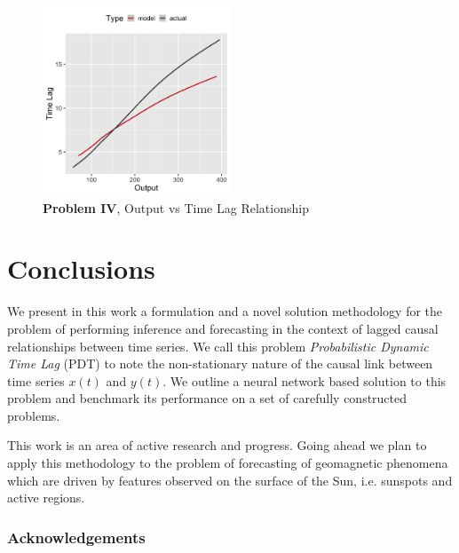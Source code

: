\documentclass[envcountsect,runningheads]{llncs}
\theoremstyle{etoile}
\begin{document}
\begin{figure}[h]
\vspace{.3in}
\centerline{\includegraphics[width=0.5\textwidth]{figures/exp4_predictive_curves.png}}
\vspace{.3in}
\caption{\textbf{Problem IV}, Output vs Time Lag Relationship}
\label{fig:problem4_curves}
\end{figure}

\section{Conclusions}

We present in this work a formulation and a novel solution methodology for the problem of performing 
inference and forecasting in the context of lagged causal relationships between time series. 
We call this problem \emph{Probabilistic Dynamic Time Lag} (PDT) to note the non-stationary nature of the 
causal link between time series $x(t)$ and $y(t)$. We outline a neural network based solution to this 
problem and benchmark its performance on a set of carefully constructed problems.

This work is an area of active research and progress. Going ahead we plan to apply this methodology 
to the problem of forecasting of geomagnetic phenomena which are driven by features observed on the 
surface of the Sun, i.e. sunspots and active regions.


\subsubsection*{Acknowledgements}

\clearpage

\end{document}

